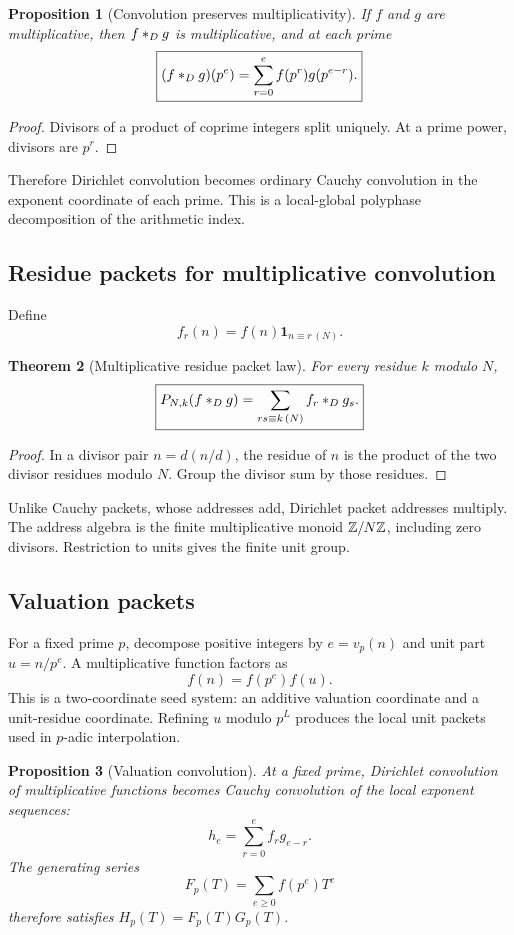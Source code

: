 \documentclass[11pt]{article}
\newtheorem{theorem}{Theorem}[section]\newtheorem{proposition}[theorem]{Proposition}\newtheorem{lemma}[theorem]{Lemma}\newtheorem{corollary}[theorem]{Corollary}
\theoremstyle{definition}\newtheorem{definition}[theorem]{Definition}\newtheorem{example}[theorem]{Example}\newtheorem{construction}[theorem]{Construction}\newtheorem{algorithm}[theorem]{Algorithm}\newtheorem{conjecture}[theorem]{Conjecture}\newtheorem{problem}[theorem]{Problem}
\theoremstyle{remark}\newtheorem{remark}[theorem]{Remark}\newtheorem{boundary}[theorem]{Boundary}\newtheorem{certificate}[theorem]{Computational Certificate}\newtheorem{classical}[theorem]{Classical Input}\newtheorem{principle}[theorem]{Structural Principle}
\begin{document}
\begin{proposition}[Convolution preserves multiplicativity]
If $f$ and $g$ are multiplicative, then $f\mathbin{\ast_D} g$ is multiplicative, and at each prime
\[
 \boxed{(f\mathbin{\ast_D} g)(p^e)=\sum_{r=0}^{e}f(p^r)g(p^{e-r}).}
\]
\end{proposition}
\begin{proof}
Divisors of a product of coprime integers split uniquely.  At a prime power, divisors are $p^r$.
\end{proof}

Therefore Dirichlet convolution becomes ordinary Cauchy convolution in the exponent coordinate of each prime.  This is a local-global polyphase decomposition of the arithmetic index.

\subsection{Residue packets for multiplicative convolution}
Define
\[
 f_r(n)=f(n)\mathbf1_{n\equiv r\,(N)}.
\]

\begin{theorem}[Multiplicative residue packet law]
For every residue $k$ modulo $N$,
\[
 \boxed{P_{N,k}(f\mathbin{\ast_D} g)
 =\sum_{rs\equiv k\,(N)} f_r\mathbin{\ast_D} g_s.}
\]
\end{theorem}
\begin{proof}
In a divisor pair $n=d(n/d)$, the residue of $n$ is the product of the two divisor residues modulo $N$.  Group the divisor sum by those residues.
\end{proof}

Unlike Cauchy packets, whose addresses add, Dirichlet packet addresses multiply.  The address algebra is the finite multiplicative monoid $\mathbb Z/N\mathbb Z$, including zero divisors.  Restriction to units gives the finite unit group.

\subsection{Valuation packets}
For a fixed prime $p$, decompose positive integers by $e=v_p(n)$ and unit part $u=n/p^e$.  A multiplicative function factors as
\[
 f(n)=f(p^e)f(u).
\]
This is a two-coordinate seed system: an additive valuation coordinate and a unit-residue coordinate.  Refining $u$ modulo $p^L$ produces the local unit packets used in $p$-adic interpolation.

\begin{proposition}[Valuation convolution]
At a fixed prime, Dirichlet convolution of multiplicative functions becomes Cauchy convolution of the local exponent sequences:
\[
 h_e=\sum_{r=0}^{e}f_r g_{e-r}.
\]
The generating series
\[
 F_p(T)=\sum_{e\geq0}f(p^e)T^e
\]
therefore satisfies $H_p(T)=F_p(T)G_p(T)$.
\end{proposition}
\end{document}
